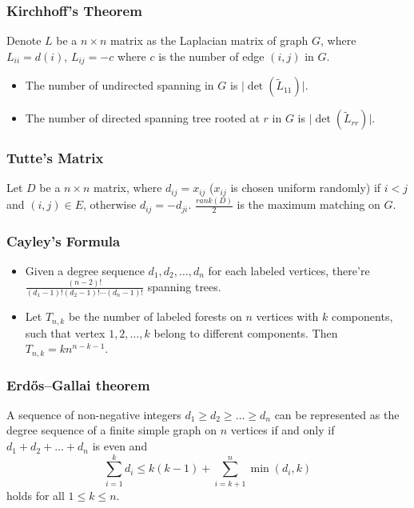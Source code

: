 
\subsubsection{Kirchhoff's Theorem}
Denote $L$ be a $n \times n$ matrix as the Laplacian matrix of graph $G$, where $L_{ii} = d(i)$, $L_{ij} = -c$ where $c$ is the number of edge $(i, j)$ in $G$.
\begin{itemize}
    \item The number of undirected spanning in $G$ is $\lvert \det(\tilde{L}_{11}) \rvert$.
    \item The number of directed spanning tree rooted at $r$ in $G$ is $\lvert \det(\tilde{L}_{rr}) \rvert$.
\end{itemize}

\subsubsection{Tutte's Matrix}
Let $D$ be a $n \times n$ matrix, where $d_{ij} = x_{ij}$ ($x_{ij}$ is chosen uniform randomly) if $i < j$ and $(i, j) \in E$, otherwise $d_{ij} = -d_{ji}$. $\frac{rank(D)}{2}$ is the maximum matching on $G$.

\subsubsection{Cayley's Formula}
\begin{itemize}
  \item Given a degree sequence $d_1, d_2, \ldots, d_n$ for each labeled vertices, there're $\frac{(n - 2)!}{(d_1 - 1)!(d_2 - 1)!\cdots(d_n - 1)!}$ spanning trees.
  \item Let $T_{n, k}$ be the number of labeled forests on $n$ vertices with $k$ components, such that vertex $1, 2, \ldots, k$ belong to different components. Then $T_{n, k} = kn^{n - k - 1}$.
\end{itemize}

\subsubsection{Erdős–Gallai theorem}
A sequence of non-negative integers $d_1 \geq d_2 \geq \ldots \geq d_n$ can be represented as the degree sequence of a finite simple graph on $n$ vertices if and only if $d_1 + d_2 + \ldots + d_n$ is even and
$$ \sum_{i = 1}^{k}d_i \leq k(k - 1) + \sum_{i = k + 1}^{n}\min(d_i, k) $$
holds for all $1 \leq k \leq n$.
